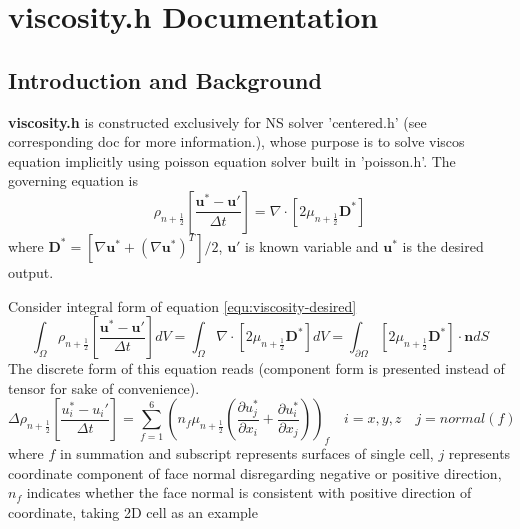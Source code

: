 \chapter{viscosity.h Documentation}
\ifsingle
\maketitle
\fi
\chaptermeta[1.0][2025-06-07]

\section{Introduction and Background}
\textbf{viscosity.h} is constructed exclusively for NS solver 'centered.h' (see corresponding doc for more information.), whose purpose is to solve viscos equation implicitly using poisson equation solver built in 'poisson.h'. The governing equation is 
\begin{equation}\label{equ:viscosity-desired}
  \rho_{n+ \frac{1}{2}}[ \frac{ \mathbf{u}^*- \mathbf{u}'}{\Delta t}] = \nabla\cdot [2\mu_{n+ \frac{1}{2}} \mathbf{D}^*]
\end{equation}
where $ \mathbf{D}^* = [\nabla \mathbf{u}^*+ (\nabla \mathbf{u}^*)^T]/2$, $ \mathbf{u}'$ is known variable and $ \mathbf{u}^*$ is the desired output.\par
Consider integral form of equation \ref{equ:viscosity-desired}
\begin{equation}
  \int_{\Omega}\rho_{n+ \frac{1}{2}} [ \frac{ \mathbf{u}^*- \mathbf{u}'}{\Delta t}]dV = \int_{\Omega}\nabla\cdot[2\mu_{n+ \frac{1}{2}} \mathbf{D}^*] dV = \int_{\partial \Omega} [2\mu_{n+ \frac{1}{2}} \mathbf{D}^*]\cdot \mathbf{n}dS
\end{equation}
The discrete form of this equation reads (component form is presented instead of tensor for sake of convenience).
\begin{equation}\label{equ:viscosity-discrete}
  \Delta \rho_{n+ \frac{1}{2}} [ \frac{u_i^*-u_i'}{\Delta t} ] = \sum_{f = 1}^6(n_f \mu_{n+ \frac{1}{2}}( \frac{\partial u_j^*}{\partial x_i}+ \frac{\partial u_i^*}{\partial x_j}))_f \quad i= x,y,z\quad j = normal(f)
\end{equation}
where $f$ in summation and subscript represents surfaces of single cell, $j$ represents coordinate component of face normal disregarding negative or positive direction, $n_f$ indicates whether the face normal is consistent with positive direction of coordinate, taking 2D cell as an example
